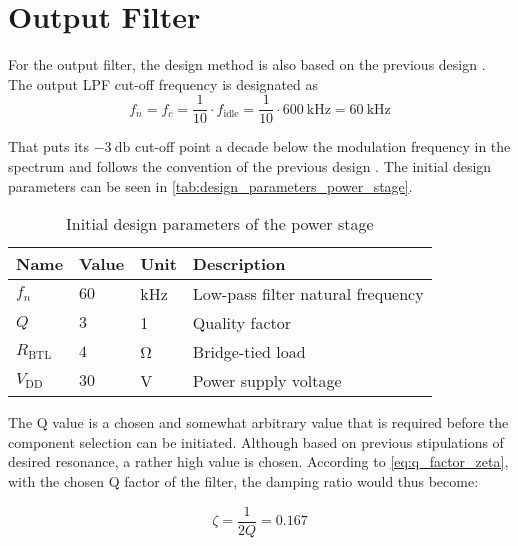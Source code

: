 \section{Output Filter}
For the output filter, the design method is also based on the previous design \cite{nagy_special_course}. The output LPF cut-off frequency is designated as 
\begin{equation}
	f_{n} = f_{c} = \frac{1}{10} \cdot f_{\mathrm{idle}} = \frac{1}{10} \cdot \SI{600}{\kilo\hertz} = \SI{60}{\kilo\hertz}
\end{equation}

That puts its $\SI{-3}{\decibel}$ cut-off point a decade below the modulation frequency in the spectrum and follows the convention of the previous design \cite{multivar_ctrl_loops_for_SM_audio_systems}. The initial design parameters can be seen in \autoref{tab:design_parameters_power_stage}.

\begin{table}[htbp]
	\centering
	\begin{tabular}{@{}llll@{}}
		\toprule
		\multicolumn{1}{c}{\textbf{Name}} & \textbf{Value} & \textbf{Unit} & \textbf{Description} \\ \midrule
		$f_{n}$ & $60$ & \si{\kilo\hertz} & Low-pass filter natural frequency \\
		$Q$ & $3$  & \si{1}  & Quality factor \\
		$R_{\mathrm{BTL}}$ & $4$  & \si{\ohm}  & Bridge-tied load \\
		$V_{\mathrm{DD}}$ & $30$  & \si{\volt}  & Power supply voltage \\
		\bottomrule
	\end{tabular}
	\caption{Initial design parameters of the power stage}
	\label{tab:design_parameters_power_stage}
\end{table}

The Q value is a chosen and somewhat arbitrary value that is required before the component selection can be initiated. Although based on previous stipulations of desired resonance, a rather high value is chosen. According to \autoref{eq:q_factor_zeta}, with the chosen Q factor of the filter, the damping ratio would thus become:

\begin{equation} \label{eq:zeta_synth}
	\zeta = \frac{1}{2Q} = 0.167
\end{equation}

